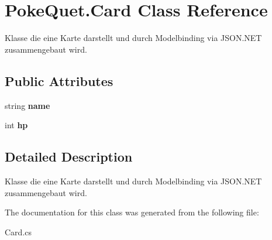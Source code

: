 \hypertarget{class_poke_quet_1_1_card}{}\section{Poke\+Quet.\+Card Class Reference}
\label{class_poke_quet_1_1_card}


Klasse die eine Karte darstellt und durch Modelbinding via J\+S\+O\+N.\+N\+ET zusammengebaut wird.  


\subsection*{Public Attributes}
\begin{DoxyCompactItemize}
\item 
\mbox{\label{class_poke_quet_1_1_card_a07bbff6c7bf7c020375b5f227c7ec9d8}} 
string {\bfseries name}
\item 
\mbox{\label{class_poke_quet_1_1_card_a5486c0c3f0a4450716fa1bf092f1793a}} 
int {\bfseries hp}
\end{DoxyCompactItemize}


\subsection{Detailed Description}
Klasse die eine Karte darstellt und durch Modelbinding via J\+S\+O\+N.\+N\+ET zusammengebaut wird. 



The documentation for this class was generated from the following file\+:\begin{DoxyCompactItemize}
\item 
Card.\+cs\end{DoxyCompactItemize}

